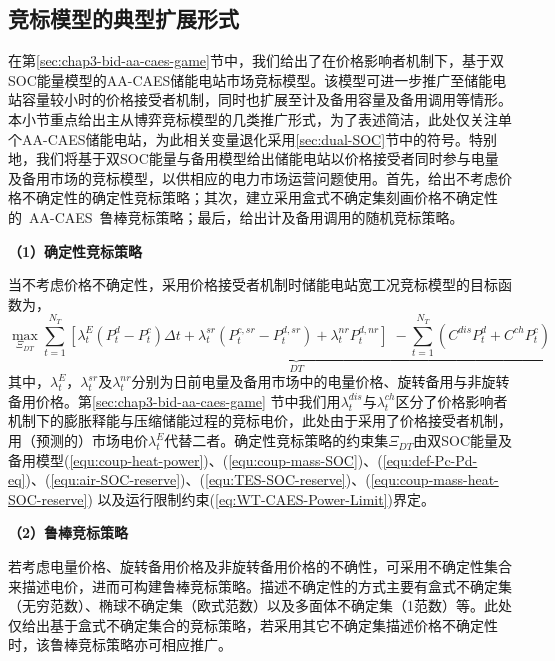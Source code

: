 \subsection{竞标模型的典型扩展形式}
\label{sec:chap3-self-schedu}

在第\ref{sec:chap3-bid-aa-caes-game}节中，我们给出了在价格影响者机制下，基于双SOC能量模型的AA-CAES储能电站市场竞标模型。该模型可进一步推广至储能电站容量较小时的价格接受者机制，同时也扩展至计及备用容量及备用调用等情形。本小节重点给出主从博弈竞标模型的几类推广形式，为了表述简洁，此处仅关注单个AA-CAES储能电站，为此相关变量退化采用\ref{sec:dual-SOC}节中的符号。特别地，我们将基于双SOC能量与备用模型给出储能电站以价格接受者同时参与电量及备用市场的竞标模型，以供相应的电力市场运营问题使用。首先，给出不考虑价格不确定性的确定性竞标策略；其次，建立采用盒式不确定集刻画价格不确定性的~AA-CAES~鲁棒竞标策略；最后，给出计及备用调用的随机竞标策略。

\textbf{（1）确定性竞标策略}

当不考虑价格不确定性，采用价格接受者机制时储能电站宽工况竞标模型的目标函数为，
\begin{equation}
\label{equ:aa-caes-self-schedule-DT}
\mathop {\max }\limits_{\Xi_{DT}}  \underbrace {\sum\limits_{t = 1}^{N_T} {\left[ {\lambda_t^E({P_t^d - P_t^c})\Delta t + \lambda_t^{sr}({P_t^{c,sr} - P_t^{d,sr}}) + \lambda_t^{nr}P_t^{d,nr}} \right]} \; - \sum\limits_{t = 1}^{N_T} {({C^{dis}P_t^d + C^{ch}P_t^c})} }_{DT}
\end{equation}
其中，$\lambda_t^E$，$\lambda_t^{sr}$及$\lambda_t^{nr}$分别为日前电量及备用市场中的电量价格、旋转备用与非旋转备用价格。第\ref{sec:chap3-bid-aa-caes-game} 节中我们用$\lambda_t^{dis}$与$\lambda_t^{ch}$区分了价格影响者机制下的膨胀释能与压缩储能过程的竞标电价，此处由于采用了价格接受者机制，用（预测的）市场电价$\lambda_t^E$代替二者。确定性竞标策略的约束集$\Xi_{DT}$由双SOC能量及备用模型(\ref{equ:coup-heat-power})、(\ref{equ:coup-mass-SOC})、(\ref{equ:def-Pc-Pd-eq})、(\ref{equ:air-SOC-reserve})、(\ref{equ:TES-SOC-reserve})、(\ref{equ:coup-mass-heat-SOC-reserve})
以及运行限制约束(\ref{eq:WT-CAES-Power-Limit})界定。

\textbf{（2）鲁棒竞标策略}

若考虑电量价格、旋转备用价格及非旋转备用价格的不确性，可采用不确定性集合来描述电价，进而可构建鲁棒竞标策略。描述不确定性的方式主要有盒式不确定集（无穷范数）、椭球不确定集（欧式范数）以及多面体不确定集（1范数）等\cite{Robust-Self-Schedule-Review-18}。此处仅给出基于盒式不确定集合的竞标策略，若采用其它不确定集描述价格不确定性时，该鲁棒竞标策略亦可相应推广。

